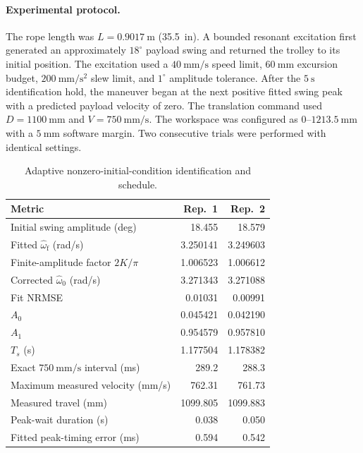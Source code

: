 \paragraph{Experimental protocol.}
The rope length was $L=0.9017~\mathrm{m}$ (35.5~in).  A bounded resonant
excitation first generated an approximately $18^{\circ}$ payload swing and
returned the trolley to its initial position.  The excitation used a
$40~\mathrm{mm/s}$ speed limit, $60~\mathrm{mm}$ excursion budget,
$200~\mathrm{mm/s^2}$ slew limit, and $1^{\circ}$ amplitude tolerance.  After
the $5~\mathrm{s}$ identification hold, the maneuver began at the next
positive fitted swing peak with a predicted payload velocity of zero.  The
translation command used $D=1100~\mathrm{mm}$ and $V=750~\mathrm{mm/s}$.
The workspace was configured as $0$--$1213.5~\mathrm{mm}$ with a
$5~\mathrm{mm}$ software margin.  Two consecutive trials were performed with
identical settings.

\begin{table}[!t]
\caption{Adaptive nonzero-initial-condition identification and schedule.}
\label{tab:nzic_schedule}
\centering
\renewcommand{\arraystretch}{1.12}
\begin{tabular}{lrr}
\hline
Metric & Rep.~1 & Rep.~2\\
\hline
Initial swing amplitude (deg) & 18.455 & 18.579\\
Fitted $\widehat{\omega}_{\mathrm f}$ (rad/s) & 3.250141 & 3.249603\\
Finite-amplitude factor $2K/\pi$ & 1.006523 & 1.006612\\
Corrected $\widehat{\omega}_0$ (rad/s) & 3.271343 & 3.271088\\
Fit NRMSE & 0.01031 & 0.00991\\
$A_0$ & 0.045421 & 0.042190\\
$A_1$ & 0.954579 & 0.957810\\
$T_s$ (s) & 1.177504 & 1.178382\\
Exact $750~\mathrm{mm/s}$ interval (ms) & 289.2 & 288.3\\
Maximum measured velocity (mm/s) & 762.31 & 761.73\\
Measured travel (mm) & 1099.805 & 1099.883\\
Peak-wait duration (s) & 0.038 & 0.050\\
Fitted peak-timing error (ms) & 0.594 & 0.542\\
\hline
\end{tabular}
\end{table}

